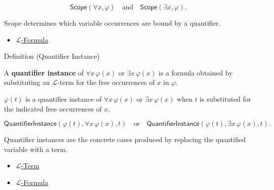 \begin{remark*}
\[
\mathsf{Scope}(\forall x,\varphi)
\quad\text{and}\quad
\mathsf{Scope}(\exists x,\varphi).
\]
\end{remark*}

\begin{remark*}[Interpretation]
Scope determines which variable occurrences are bound by a quantifier.
\end{remark*}

\begin{dependencies}
\begin{itemize}
  \item \hyperref[def:l-formula]{$\mathcal{L}$-Formula}
\end{itemize}
\end{dependencies}

\begin{definitionbox}{Definition (Quantifier Instance)}
\begin{definition}\label{def:quantifier-instance}
A \textbf{quantifier instance} of $\forall x\,\varphi(x)$ or
$\exists x\,\varphi(x)$ is a formula obtained by substituting an
$\mathcal{L}$-term for the free occurrences of $x$ in $\varphi$.
\end{definition}
\end{definitionbox}

\begin{remark*}
$\varphi(t)$ is a quantifier instance of $\forall x\,\varphi(x)$ or
$\exists x\,\varphi(x)$ when $t$ is substituted for the indicated free
occurrences of $x$.
\end{remark*}

\begin{remark*}
\[
\mathsf{QuantifierInstance}(\varphi(t),\forall x\,\varphi(x),t)
\quad\text{or}\quad
\mathsf{QuantifierInstance}(\varphi(t),\exists x\,\varphi(x),t).
\]
\end{remark*}

\begin{remark*}[Interpretation]
Quantifier instances are the concrete cases produced by replacing the
quantified variable with a term.
\end{remark*}

\begin{dependencies}
\begin{itemize}
  \item \hyperref[def:l-term]{$\mathcal{L}$-Term}
  \item \hyperref[def:l-formula]{$\mathcal{L}$-Formula}
\end{itemize}
\end{dependencies}

